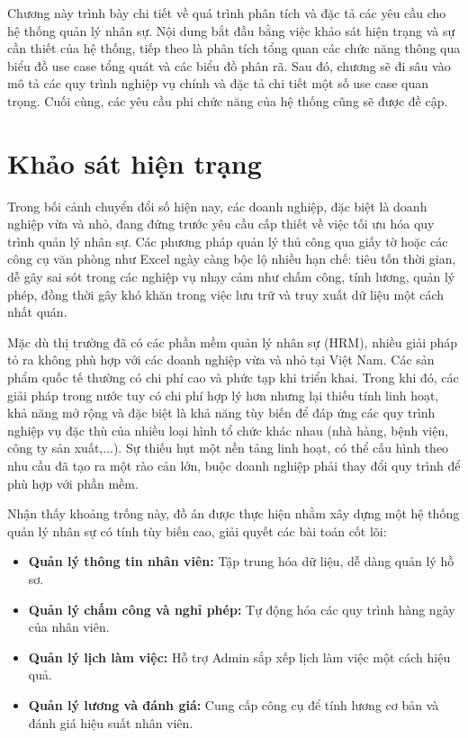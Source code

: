 \documentclass[../DoAn.tex]{subfiles}
\begin{document}
Chương này trình bày chi tiết về quá trình phân tích và đặc tả các yêu cầu cho hệ thống quản lý nhân sự. Nội dung bắt đầu bằng việc khảo sát hiện trạng và sự cần thiết của hệ thống, tiếp theo là phân tích tổng quan các chức năng thông qua biểu đồ use case tổng quát và các biểu đồ phân rã. Sau đó, chương sẽ đi sâu vào mô tả các quy trình nghiệp vụ chính và đặc tả chi tiết một số use case quan trọng. Cuối cùng, các yêu cầu phi chức năng của hệ thống cũng sẽ được đề cập.

\section{Khảo sát hiện trạng}
\label{section:2.1}
Trong bối cảnh chuyển đổi số hiện nay, các doanh nghiệp, đặc biệt là doanh nghiệp vừa và nhỏ, đang đứng trước yêu cầu cấp thiết về việc tối ưu hóa quy trình quản lý nhân sự. Các phương pháp quản lý thủ công qua giấy tờ hoặc các công cụ văn phòng như Excel ngày càng bộc lộ nhiều hạn chế: tiêu tốn thời gian, dễ gây sai sót trong các nghiệp vụ nhạy cảm như chấm công, tính lương, quản lý phép, đồng thời gây khó khăn trong việc lưu trữ và truy xuất dữ liệu một cách nhất quán.

Mặc dù thị trường đã có các phần mềm quản lý nhân sự (HRM), nhiều giải pháp tỏ ra không phù hợp với các doanh nghiệp vừa và nhỏ tại Việt Nam. Các sản phẩm quốc tế thường có chi phí cao và phức tạp khi triển khai. Trong khi đó, các giải pháp trong nước tuy có chi phí hợp lý hơn nhưng lại thiếu tính linh hoạt, khả năng mở rộng và đặc biệt là khả năng tùy biến để đáp ứng các quy trình nghiệp vụ đặc thù của nhiều loại hình tổ chức khác nhau (nhà hàng, bệnh viện, công ty sản xuất,...). Sự thiếu hụt một nền tảng linh hoạt, có thể cấu hình theo nhu cầu đã tạo ra một rào cản lớn, buộc doanh nghiệp phải thay đổi quy trình để phù hợp với phần mềm.

Nhận thấy khoảng trống này, đồ án được thực hiện nhằm xây dựng một hệ thống quản lý nhân sự có tính tùy biến cao, giải quyết các bài toán cốt lõi:
\begin{itemize}
    \item \textbf{Quản lý thông tin nhân viên:} Tập trung hóa dữ liệu, dễ dàng quản lý hồ sơ.
    \item \textbf{Quản lý chấm công và nghỉ phép:} Tự động hóa các quy trình hàng ngày của nhân viên.
    \item \textbf{Quản lý lịch làm việc:} Hỗ trợ Admin sắp xếp lịch làm việc một cách hiệu quả.
    \item \textbf{Quản lý lương và đánh giá:} Cung cấp công cụ để tính lương cơ bản và đánh giá hiệu suất nhân viên.
\end{itemize}
\end{document}
